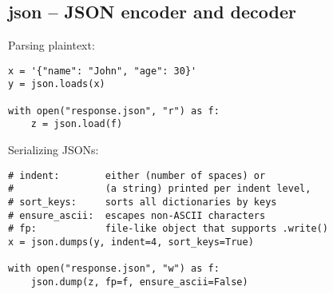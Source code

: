 %

\subsection{json -- JSON encoder and decoder}
Parsing plaintext:
\begin{verbatim}
x = '{"name": "John", "age": 30}'
y = json.loads(x)

with open("response.json", "r") as f:
    z = json.load(f)
\end{verbatim}

Serializing JSONs:
\begin{verbatim}
# indent:        either (number of spaces) or
#                (a string) printed per indent level,
# sort_keys:     sorts all dictionaries by keys
# ensure_ascii:  escapes non-ASCII characters
# fp:            file-like object that supports .write()
x = json.dumps(y, indent=4, sort_keys=True)

with open("response.json", "w") as f:
    json.dump(z, fp=f, ensure_ascii=False)
\end{verbatim}

%